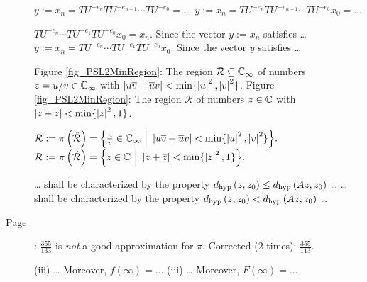 \begin{description}
{$y := x_n = TU^{-e_n} TU^{-e_{n-1}} \cdots TU^{-e_0} = \dots$}
{$y := x_n = TU^{-e_n} TU^{-e_{n-1}} \cdots TU^{-e_0} x_0 = \dots$}

{$TU^{-e_n} \cdots TU^{-e_1} TU^{-e_0} x_0 = x_n.$ \quad Since the vector $y := x_n$ satisfies \dots}
{$y := x_n = TU^{-e_n} \cdots TU^{-e_1} TU^{-e_0} x_0.$ \quad Since the vector $y$ satisfies \dots}

{Figure \ref{fig_PSL2MinRegion}: The region $\mathcal{R} \subseteq \mathbb{C}_{\infty}$ of numbers $z = u/v \in \mathbb{C}_{\infty}$ with $\left|u\overline{v} + \overline{u}v\right| < \min\{\left|u\right|^2,\left|v\right|^2\}$.}
{Figure \ref{fig_PSL2MinRegion}: The region $\mathcal{R}$ of numbers $z \in \mathbb{C}$ with $\left|z + \overline{z}\right| < \min\{\left|z\right|^2, 1\}$.}

{$\mathcal{R} := \pi\left(\hat{\mathcal{R}}\right) = 
\Big\{ \frac{u}{v} \in \mathbb{C}_{\infty} \ \Big| \ \left|u\overline{v} + \overline{u}v\right| < \min\{\left|u\right|^2, \left|v\right|^2\} \Big\}.$}
{$\mathcal{R} := \pi\left(\hat{\mathcal{R}}\right) = 
\Big\{ z \in \mathbb{C} \ \Big| \ \left|z + \overline{z}\right| < \min\{\left|z\right|^2, 1\} \Big\}.$}

{\dots{} shall be characterized by the property $d_\text{hyp}\left({z},{z_0}\right) \le d_\text{hyp}\left({Az},{z_0}\right)$ \dots}
{\dots{} shall be characterized by the property $d_\text{hyp}\left({z},{z_0}\right) < d_\text{hyp}\left({Az},{z_0}\right)$ \dots}

\item[Page \pageref{err_PiApprox}]: $\frac{355}{133}$ is \emph{not} a good approximation for $\pi$. Corrected (2 times): $\frac{355}{113}$.

{(iii) \dots{} Moreover, \quad $f(\infty) = \dots$}
{(iii) \dots{} Moreover, \quad $F(\infty) = \dots$}

\end{description}
